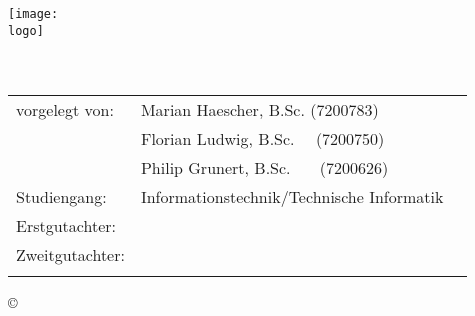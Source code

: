 \thispagestyle{empty}
\begin{titlepage}
	\begin{center}

		\texttt{[image: \\logo]}\\[15ex]
		
		\Huge{\textbf{\art}}\\[7ex]
		\Large{\textbf{\titel}}\\[13ex]
				
		\normalsize
		\begin{tabular}{lll}\\
		vorgelegt von:  & \quad Marian Haescher, B.Sc. (7200783)\\[1.2ex]
						& \quad Florian Ludwig, B.Sc. \ \ (7200750)\\[1.2ex]
						& \quad Philip Grunert, B.Sc. \ \ \ (7200626)\\[1.2ex]
		Studiengang: 	& \quad Informationstechnik/Technische Informatik\\[1.2ex]
		Erstgutachter:  & \quad \erstgutachter\\[1.2ex]
		Zweitgutachter: & \quad \zweitgutachterA\\[1.2ex]
						& \quad \zweitgutachterB\\[3ex]
		\end{tabular}
		
		\copyright\ \jahr

	\end{center}
\end{titlepage}